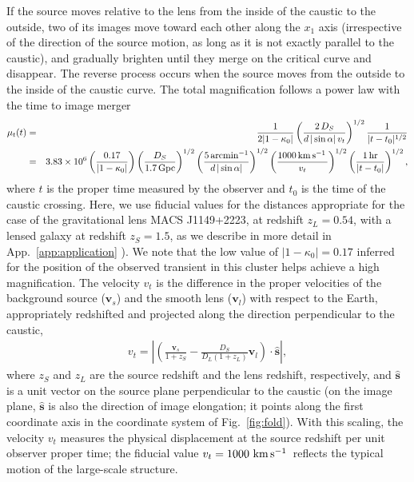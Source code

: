 \documentclass{aastex6}
\newcommand{\bt}[1]{\mathbf #1}
\newcommand{\reffig}[1]{Fig.~\ref{fig:#1}}
\newcommand{\refapp}[1]{App.~\ref{app:#1}}
\def\kms{\, {\rm km}\, {\rm s}^{-1}\, }
\newcommand{\ba}{\begin{eqnarray}}
\newcommand{\ea}{\end{eqnarray}}
\newcommand{\en}{\nonumber\\}
\begin{document}
 If the source moves relative to the lens from the inside of the caustic to the outside, two of its images move toward each other along the $x_1$ axis (irrespective of the direction of the source motion, as long as it is not exactly parallel to the caustic), and gradually brighten until they merge on the critical curve and disappear. The reverse process occurs when the source moves from the outside to the inside of the caustic curve. The total magnification follows a power law with the time to image merger
\ba
\label{eq:muoft}
\mu_t(t) & = & \frac{1}{2|1-\kappa_0|}
 \left( \frac{2\,D_S}{d\,|\sin\alpha|\,v_t} \right)^{1/2}
 \frac{1}{|t-t_0|^{1/2}} \en
& = & 3.83 \times 10^6 \left( \frac{0.17}{|1-\kappa_0|} \right)
 \left( \frac{D_S}{1.7\,{\rm Gpc}} \right)^{1/2} 
 \left( \frac{5\,{\rm arcmin}^{-1}}{d\,|\sin\alpha|} \right)^{1/2}
 \left( \frac{1000\kms}{v_t} \right)^{1/2}
 \left( \frac{1\,{\rm hr}}{|t-t_0|} \right)^{1/2} ,
\ea
where $t$ is the proper time measured by the observer and $t_0$ is the time of the 
caustic crossing. Here, we use fiducial values for the distances appropriate for the 
case of the gravitational lens MACS J1149+2223, at redshift $z_L=0.54$, with a lensed 
galaxy at redshift $z_S=1.5$, as we describe in more detail in \refapp{application}
\citep[see][]{2016ATel.9097....1K}). We note that the low value of $|1-\kappa_0|=0.17$ inferred for the position of the observed transient in this cluster helps achieve a high magnification. The velocity $v_t$ is the difference in the proper velocities 
of the background source ($\bt v_s$) and the smooth lens ($\bt v_l$) with respect to 
the Earth, appropriately redshifted and projected along the direction perpendicular to the 
caustic,
\ba
\label{eq:vrel}
v_t = \left| \left( \frac{\bt v_s}{1 + z_S} - \frac{D_S}{D_L(1+z_L)} \bt v_l
 \right) \cdot  \hat{\bt s} \right|, \label{eq:projv}
\ea
where $z_S$ and $z_L$ are the source redshift and the lens redshift, respectively, and $\hat{\bt s}$ is a unit vector on the source plane perpendicular to the caustic (on the image plane, $\hat{\bt s}$ is also the direction of image elongation; it points along the first coordinate axis in the coordinate system of \reffig{fold}). With this scaling, the velocity $v_t$ measures the physical displacement at the source redshift per unit observer proper time; the fiducial value $v_t=1000 \, \kms$ reflects the typical motion of the large-scale structure.
\end{document}
